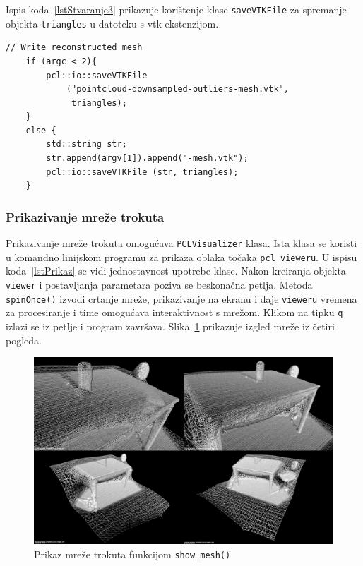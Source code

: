 Ispis koda~\ref{lstStvaranje3} prikazuje korištenje klase
\texttt{saveVTKFile} za spremanje objekta \texttt{triangles} u datoteku
s vtk ekstenzijom.

\begin{lstlisting}[label=lstStvaranje3,caption={Dio izvornog koda za
    zapisivanju mreže iz funkcije \texttt{reconstruct\_mesh()} }]
    // Write reconstructed mesh
    if (argc < 2){
        pcl::io::saveVTKFile
            ("pointcloud-downsampled-outliers-mesh.vtk",
             triangles);
    }
    else {
        std::string str;
        str.append(argv[1]).append("-mesh.vtk");
        pcl::io::saveVTKFile (str, triangles);
    }
\end{lstlisting}


\newpage
\subsubsection{Prikazivanje mreže trokuta} %
\label{ssub:Prikazivanje mreže trokuta}
Prikazivanje mreže trokuta omogućava \texttt{PCLVisualizer} klasa. Ista
klasa se koristi u komandno linijskom programu za prikaza oblaka točaka
\texttt{pcl\_vieweru}. U ispisu koda~\ref{lstPrikaz} se vidi
jednostavnost upotrebe klase. Nakon kreiranja objekta \texttt{viewer} i
postavljanja parametara poziva se beskonačna petlja. Metoda
\texttt{spinOnce()} izvodi crtanje mreže, prikazivanje na ekranu i
daje \texttt{vieweru} vremena za procesiranje i time omogućava
interaktivnost s mrežom. Klikom na tipku \texttt{q} izlazi se iz petlje
i program završava. Slika~\ref{fig:tablesecne-mesh-perspectives}
prikazuje izgled mreže iz četiri pogleda.

\begin{figure}[h]
\centering
\includegraphics[scale=0.25]{figures/tablescene-mesh-perspectives.png}
\caption{Prikaz mreže trokuta funkcijom \texttt{show\_mesh()} }
\label{fig:tablesecne-mesh-perspectives}
\end{figure}

